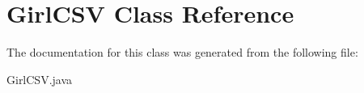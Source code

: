 \hypertarget{class_girl_c_s_v}{}\section{Girl\+C\+SV Class Reference}
\label{class_girl_c_s_v}


The documentation for this class was generated from the following file\+:\begin{DoxyCompactItemize}
\item 
Girl\+C\+S\+V.\+java\end{DoxyCompactItemize}
